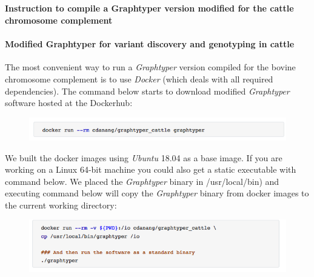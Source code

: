 \documentclass[../main.tex]{subfiles}
\begin{document}
\fi



\newpage

\renewcommand \thesubsection {Additional file 2.\arabic{subsection}}

\captionsetup[figure]{list=no}
\captionsetup[table]{list=no}

\begin{flushleft}
\normalsize

\subsection{}
\label{supp_mat:21}
\textbf{\large{Instruction to compile a Graphtyper version modified for the cattle chromosome complement}}


\paragraph*{Modified Graphtyper for variant discovery and genotyping in cattle}

The most convenient way to run a \emph{Graphtyper} version compiled for the bovine chromosome complement is to use \emph{Docker} (which deals with all required dependencies). The command below starts to download modified \emph{Graphtyper} software hosted at the Dockerhub:

\begin{figure}[h]
    \centering
    \includegraphics[width=\textwidth]{paper1/supplement/sp11.png}
\end{figure}

We built the docker images using \emph{Ubuntu} 18.04 as a base image. If you are working on a Linux
64-bit machine you could also get a static executable with command below. We placed the
\emph{Graphtyper} binary in /usr/local/bin) and executing command below will copy the \emph{Graphtyper}
binary from docker images to the current working directory:

\begin{figure}[h]
    \centering
    \includegraphics[width=\textwidth]{paper1/supplement/sp12.png}
\end{figure}


\end{flushleft}
\end{document}
